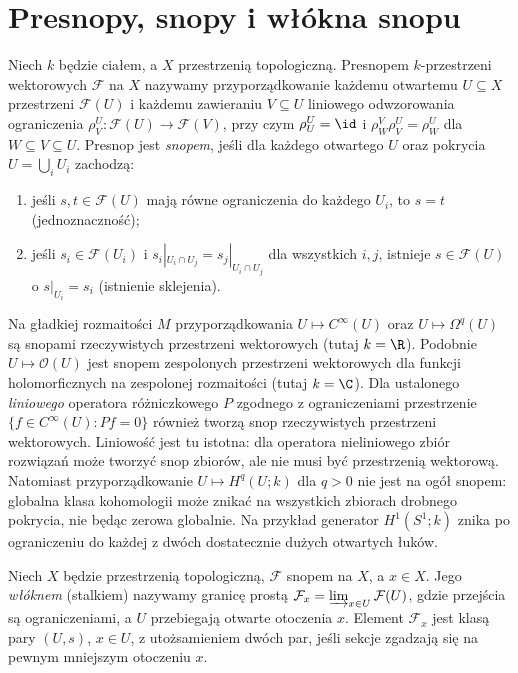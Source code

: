 \section{Presnopy, snopy i włókna snopu}
\begin{definicja}
\label{def:sheaf-v12}
Niech $k$ będzie ciałem, a $X$ przestrzenią topologiczną. Presnopem
$k$-przestrzeni wektorowych $\mathcal F$ na $X$ nazywamy przyporządkowanie
każdemu otwartemu $U\subseteq X$ przestrzeni $\mathcal F(U)$ i każdemu
zawieraniu $V\subseteq U$ liniowego odwzorowania ograniczenia
$\rho^U_V:\mathcal F(U)\to\mathcal F(V)$, przy czym
$\rho^U_U=\id$ i $\rho^V_W\rho^U_V=\rho^U_W$ dla $W\subseteq V\subseteq U$.
Presnop jest \emph{snopem}, jeśli dla każdego otwartego $U$ oraz
pokrycia $U=\bigcup_iU_i$ zachodzą:
\begin{enumerate}[label=(\roman*)]
\item jeśli $s,t\in\mathcal F(U)$ mają równe ograniczenia do każdego $U_i$,
  to $s=t$ (jednoznaczność);
\item jeśli $s_i\in\mathcal F(U_i)$ i
  $s_i|_{U_i\cap U_j}=s_j|_{U_i\cap U_j}$ dla wszystkich $i,j$,
  istnieje $s\in\mathcal F(U)$ o $s|_{U_i}=s_i$ (istnienie sklejenia).
\end{enumerate}
\end{definicja}

\begin{przyklad}
Na gładkiej rozmaitości $M$ przyporządkowania
$U\mapsto C^\infty(U)$ oraz $U\mapsto\Omega^q(U)$ są snopami
rzeczywistych przestrzeni wektorowych (tutaj $k=\R$).
Podobnie $U\mapsto\mathcal O(U)$ jest snopem zespolonych
przestrzeni wektorowych dla funkcji holomorficznych na
zespolonej rozmaitości (tutaj $k=\C$).
Dla ustalonego \emph{liniowego} operatora różniczkowego $P$
zgodnego z ograniczeniami przestrzenie
$\{f\in C^\infty(U):Pf=0\}$ również tworzą snop
rzeczywistych przestrzeni wektorowych. Liniowość jest tu
istotna: dla operatora nieliniowego zbiór rozwiązań
może tworzyć snop zbiorów, ale nie musi być przestrzenią wektorową.
Natomiast przyporządkowanie $U\mapsto H^q(U;k)$ dla $q>0$ nie jest
na ogół snopem: globalna klasa kohomologii może znikać na wszystkich
zbiorach drobnego pokrycia, nie będąc zerowa globalnie.
Na przykład generator $H^1(S^1;k)$ znika po ograniczeniu
do każdej z dwóch dostatecznie dużych otwartych łuków.
\end{przyklad}

\begin{definicja}
Niech $X$ będzie przestrzenią topologiczną,
$\mathcal F$ snopem na $X$, a $x\in X$. Jego \emph{włóknem} (stalkiem)
nazywamy granicę prostą
$\mathcal F_x=\varinjlim_{x\in U}\mathcal F(U)$, gdzie przejścia
są ograniczeniami, a $U$ przebiegają otwarte otoczenia $x$.
Element $\mathcal F_x$ jest klasą pary $(U,s)$, $x\in U$,
z utożsamieniem dwóch par, jeśli sekcje zgadzają się
na pewnym mniejszym otoczeniu $x$.
\end{definicja}

